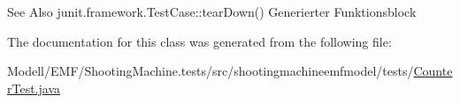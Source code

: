 \begin{DoxySeeAlso}{See Also}
junit.\-framework.\-Test\-Case\-::tear\-Down() Generierter Funktionsblock 
\end{DoxySeeAlso}


The documentation for this class was generated from the following file\-:\begin{DoxyCompactItemize}
\item 
Modell/\-E\-M\-F/\-Shooting\-Machine.\-tests/src/shootingmachineemfmodel/tests/\hyperlink{_counter_test_8java}{Counter\-Test.\-java}\end{DoxyCompactItemize}
